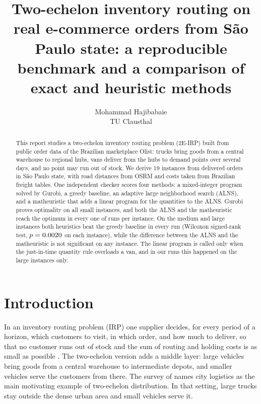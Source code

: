 \documentclass[11pt,a4paper]{article}
\title{Two-echelon inventory routing on real e-commerce orders from S\~ao Paulo state:
a reproducible benchmark and a comparison of exact and heuristic methods}
\author{Mohammad Hajibabaie\\TU Clausthal}
\date{}
\begin{document}
\maketitle

\begin{abstract}
\noindent
This report studies a two-echelon inventory routing problem (2E-IRP) built from public order data
of the Brazilian marketplace Olist: trucks bring goods from a central warehouse to regional hubs,
vans deliver from the hubs to demand points over several days, and no point may run out of stock. We derive 19 instances from \nOrders{} delivered orders in S\~ao Paulo state, with road
distances from OSRM and costs taken from Brazilian freight tables. One independent checker scores four methods: a mixed-integer program solved by Gurobi, a greedy
baseline, an adaptive large neighborhood search (ALNS), and a matheuristic that adds a linear
program for the quantities to the ALNS. Gurobi proves optimality on all \nSmall{}
small instances, and both the ALNS and the matheuristic reach the optimum in every one of
\nSeeds{} runs per instance. On the medium and large instances both heuristics beat the greedy
baseline in every run (Wilcoxon signed-rank test, $p = 0.0020$ on each instance), while the
difference between the ALNS and the matheuristic is not significant on any instance. The linear
program is called only when the just-in-time quantity rule overloads a van, and in our runs this
happened on the large instances only.

\end{abstract}

\section{Introduction}\label{sec:intro}

In an inventory routing problem (IRP) one supplier decides, for every period of a horizon, which
customers to visit, in which order, and how much to deliver, so that no customer runs out of
stock and the sum of routing and holding costs is as small as possible
\citep{archetti2007branch,coelho2014thirty}. The two-echelon version adds a middle layer: large
vehicles bring goods from a central warehouse to intermediate depots, and smaller vehicles serve
the customers from there. The survey of \citet{cuda2015survey} names city logistics as the main motivating example of
two-echelon distribution. In that setting, large trucks stay outside the dense urban area and small
vehicles serve it.
\end{document}
